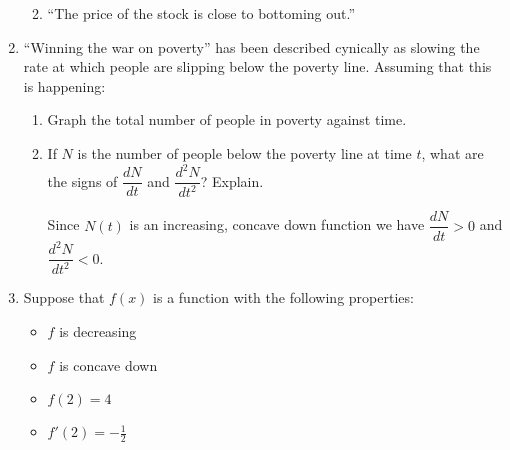 \documentclass[11pt]{article}
\begin{document}
\begin{enumerate}
\begin{enumerate}
{\begin{center}
      \end{center}
    }
    \vfill
  \item ``The price of the stock is close to bottoming out.''
    \vfill
    {\color{blue}
      \begin{center}
      \end{center}
    }
    \vfill
  \end{enumerate}

\newpage

\item ``Winning the war on poverty'' has been described cynically as
  slowing the rate at which people are slipping below the poverty
  line. Assuming that this is happening:
  \begin{enumerate}
  \item Graph the total number of people in poverty against time.
    \vfill
    {\color{blue}
      \begin{center}
      \end{center}
    }
    \vfill
  \item If $N$ is the number of people below the poverty line at time
    $t$, what are the signs of $\dfrac{dN}{dt}$ and
    $\dfrac{d^2N}{dt^2}$? Explain.
    \vfill
    {\color{blue}

      Since $N(t)$ is an increasing, concave down function we have
      $\dfrac{dN}{dt} > 0$ and $\dfrac{d^2N}{dt^2} < 0$.

    }
    \vfill
  \end{enumerate}

\newpage

\item Suppose that $f(x)$ is a function with the following properties:
  \begin{itemize}
  \item $f$ is decreasing
  \item $f$ is concave down
  \item $f(2)=4$
  \item $f'(2)=-\frac{1}{2}$
  \end{itemize}


\end{enumerate}
\end{document}
